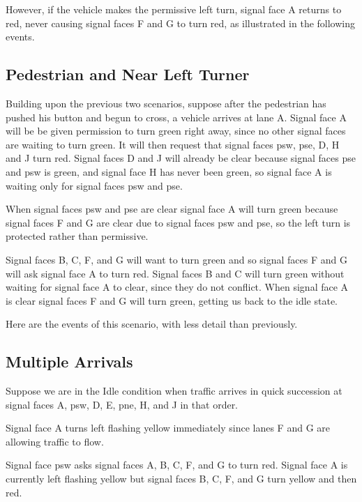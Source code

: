 \documentclass[letterpaper,twoside]{article}
\begin{document}


However, if the vehicle makes the permissive left turn, signal face A
returns to red, never causing signal faces F and G to turn red,
as illustrated in the following events.



\subsection{Pedestrian and Near Left Turner}

Building upon the previous two scenarios, suppose after the pedestrian
has pushed his button and begun to cross, a vehicle arrives at lane A.
Signal face A will be be given permission to turn green right away, since no
other signal faces are waiting to turn green.  It will then request
that signal faces psw, pse, D, H and J turn red.  Signal faces D and J
will already be clear because signal faces pse and psw is green,
and signal face H has never been green, so signal face A is waiting
only for signal faces psw and pse.

When signal faces psw and pse are clear signal face A will turn green because
signal faces F and G are clear due to signal faces psw and pse,
so the left turn is protected rather than permissive.

Signal faces B, C, F, and G will want to turn green and so signal faces
F and G will ask signal face A to turn red.  Signal faces B and C
will turn green without waiting for signal face A to clear, since
they do not conflict.  When signal face A is clear signal faces
F and G will turn green, getting us back to the idle state.

Here are the events of this scenario, with less detail than
previously.



\subsection{Multiple Arrivals}

Suppose we are in the Idle condition when traffic arrives in quick succession
at signal faces A, psw, D, E, pne, H, and J in that order.

Signal face A turns left flashing yellow immediately since lanes
F and G are allowing traffic to flow.

Signal face psw asks signal faces A, B, C, F, and G to turn red.
Signal face A is currently left flashing yellow but signal faces
B, C, F, and G turn yellow and then red.
\end{document}
